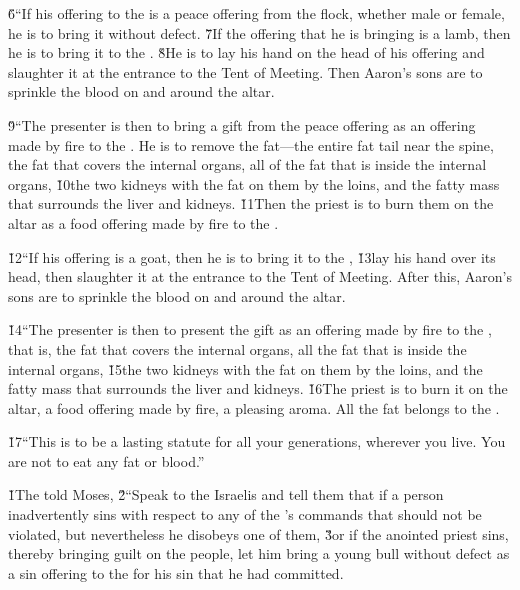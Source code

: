 \v{6}``If his offering to the  is a peace offering from the flock, whether male or female, he is to bring it without defect. \v{7}If the offering that he is bringing is a lamb, then he is to bring it to the . \v{8}He is to lay his hand on the head of his offering and slaughter it at the entrance to the Tent of Meeting. Then Aaron's sons are to sprinkle the blood on and around the altar.

\v{9}``The presenter is then to bring a gift from the peace offering as an offering made by fire to the . He is to remove the fat---the entire fat tail near the spine, the fat that covers the internal organs, all of the fat that is inside the internal organs, \v{10}the two kidneys with the fat on them by the loins, and the fatty mass that surrounds the liver and kidneys. \v{11}Then the priest is to burn them on the altar as a food offering made by fire to the .

\v{12}``If his offering is a goat, then he is to bring it to the , \v{13}lay his hand over its head, then slaughter it at the entrance to the Tent of Meeting. After this, Aaron's sons are to sprinkle the blood on and around the altar.

\v{14}``The presenter is then to present the gift as an offering made by fire to the , that is, the fat that covers the internal organs, all the fat that is inside the internal organs, \v{15}the two kidneys with the fat on them by the loins, and the fatty mass that surrounds the liver and kidneys. \v{16}The priest is to burn it on the altar, a food offering made by fire, a pleasing aroma. All the fat belongs to the .

\v{17}``This is to be a lasting statute for all your generations, wherever you live. You are not to eat any fat or blood.''

\v{1}The  told Moses, \v{2}``Speak to the Israelis and tell them that if a person inadvertently sins with respect to any of the 's commands that should not be violated, but nevertheless he disobeys one of them, \v{3}or if the anointed priest sins, thereby bringing guilt on the people, let him bring a young bull without defect as a sin offering to the  for his sin that he had committed.

